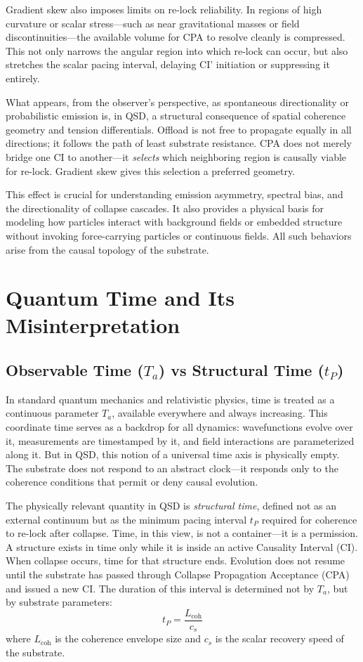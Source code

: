 \documentclass[preprints,article,submit,pdftex,moreauthors]{Definitions/mdpi}
\begin{document}
Gradient skew also imposes limits on re-lock reliability. In regions of high curvature or scalar stress—such as near gravitational masses or field discontinuities—the available volume for CPA to resolve cleanly is compressed. This not only narrows the angular region into which re-lock can occur, but also stretches the scalar pacing interval, delaying CI' initiation or suppressing it entirely.

What appears, from the observer’s perspective, as spontaneous directionality or probabilistic emission is, in QSD, a structural consequence of spatial coherence geometry and tension differentials. Offload is not free to propagate equally in all directions; it follows the path of least substrate resistance. CPA does not merely bridge one CI to another—it \emph{selects} which neighboring region is causally viable for re-lock. Gradient skew gives this selection a preferred geometry.

This effect is crucial for understanding emission asymmetry, spectral bias, and the directionality of collapse cascades. It also provides a physical basis for modeling how particles interact with background fields or embedded structure without invoking force-carrying particles or continuous fields. All such behaviors arise from the causal topology of the substrate.

\section{Quantum Time and Its Misinterpretation}

\subsection{Observable Time (\texorpdfstring{$T_a$}{Ta}) vs Structural Time (\texorpdfstring{$t_P$}{tP})}

In standard quantum mechanics and relativistic physics, time is treated as a continuous parameter \(T_a\), available everywhere and always increasing. This coordinate time serves as a backdrop for all dynamics: wavefunctions evolve over it, measurements are timestamped by it, and field interactions are parameterized along it. But in QSD, this notion of a universal time axis is physically empty. The substrate does not respond to an abstract clock—it responds only to the coherence conditions that permit or deny causal evolution.

The physically relevant quantity in QSD is \emph{structural time}, defined not as an external continuum but as the minimum pacing interval \(t_P\) required for coherence to re-lock after collapse. Time, in this view, is not a container—it is a permission. A structure exists in time only while it is inside an active Causality Interval (CI). When collapse occurs, time for that structure ends. Evolution does not resume until the substrate has passed through Collapse Propagation Acceptance (CPA) and issued a new CI. The duration of this interval is determined not by \(T_a\), but by substrate parameters:
\[
t_P = \frac{L_{\text{coh}}}{c_s}
\]
where \(L_{\text{coh}}\) is the coherence envelope size and \(c_s\) is the scalar recovery speed of the substrate.
\end{document}
